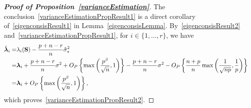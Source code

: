 \documentclass[times,sort&compress,3p]{elsarticle}
\newcommand{\bfsym}[1]{\ensuremath{\boldsymbol{#1}}}
\def\blambda {\bfsym {\lambda}}        \def\bLambda {\bfsym {\Lambda}}
\theoremstyle{plain}
\theoremstyle{definition}
\theoremstyle{remark}
\begin{document}
\begin{appendices}
\begin{proof}[\textbf{Proof of Proposition~\ref{varianceEstimation}}]
    The conclusion~\eqref{varianceEstimationPropResult1} is a direct corollary of~\eqref{eigenconsisResult1} in Lemma~\ref{eigenconsisLemma}.
    By~\eqref{eigenconsisResult2} and~\eqref{varianceEstimationPropResult1}, for $i\in\{1,\ldots, r\}$, we have 
    \begin{align*}
        \hat{\blambda}_i=&
        \lambda_i(\BS)-\frac{p+n-r}{n}\hat{\sigma}_*^2\\
    =& \blambda_i +\frac{p+n-r}{n}\sigma^2+O_P\left\{\max\left(\frac{p^{\beta}}{\sqrt{n}},1\right)\right\}
    -\frac{p+n-r}{n}\sigma^2-O_P\left\{ \frac{n+p}{n}\max\left(\frac{1}{\sqrt{np}},\frac{1}{p}\right)\right\}\\
=& \blambda_i+O_P\left\{\max\left(\frac{p^{\beta}}{\sqrt{n}},1\right)\right\},
    \end{align*}
    which proves~\eqref{varianceEstimationPropResult2}.
\end{proof}




\end{appendices}
\end{document}
